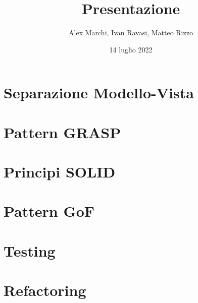 \documentclass{beamer}
\begin{document}
    \title{Presentazione}
    \author{Alex Marchi, Ivan Ravasi, Matteo Rizzo}
    \date{14 luglio 2022}

    \frame{\titlepage}

    


    \section{Separazione Modello-Vista}
    

    \section{Pattern GRASP}
    

    \section{Principi SOLID}
    

    \section{Pattern GoF}
    

    \section{Testing}
    

    \section{Refactoring}
    
\end{document}

